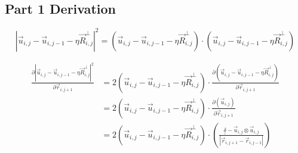 \documentclass{article}
\renewcommand{\ij}{_{i,j}}
\newcommand{\ijj}{_{i,j-1}}
\newcommand{\magn}[1]{\left\vert #1 \right\vert }
\renewcommand{\part}[2]{\frac{\partial #1 }{\partial #2}}
\newcommand{\ten}[1]{\underline{\underline{#1}}}
\newcommand{\Rij}{\vec{R} \ij}
\newcommand{\rijj}{\vec{r} \ijj}
\newcommand{\uij}{\vec{u} \ij}
\newcommand{\uijj}{\vec{u} \ijj}
\begin{document}
\subsection{Part 1 Derivation}

\begin{equation}
  \magn{\uij - \uijj - \eta \Rij^\perp}^2 
  =
  \left(\uij - \uijj - \eta \Rij^\perp\right)
  \cdot 
  \left(\uij - \uijj - \eta \Rij^\perp\right)
\end{equation}

\begin{align*}
  \part{\magn{\uij - \uijj - \eta \Rij^\perp}^2 }{
    \vec{r} _{i,j+1}
  }
  &=
  2\left(\uij - \uijj - \eta \Rij^\perp\right) \cdot
  \part{\left(\uij - \uijj - \eta \Rij^\perp\right)}{
    \vec{r} _{i,j+1}
  }
  \\
  &=
  2\left(\uij - \uijj - \eta \Rij^\perp\right) \cdot
  \part{\left(\uij \right)}{
    \vec{r} _{i,j+1}
  }
  \\
  &=
  2\left(\uij - \uijj - \eta \Rij^\perp\right) \cdot
  \left(
  \frac{\ten{\delta} - \uij \otimes \uij }{\magn{
    \vec{r} _{i,j+1}
    - \rijj}}
  \right)
\end{align*}
\end{document}
